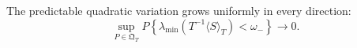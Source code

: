 The predictable quadratic variation grows uniformly in every direction:
\[
 \sup_{P\in\mathfrak Q_T}
 P\!\left\{\lambda_{\min}\!\left(T^{-1}\langle S\rangle_T\right)<\omega_-\right\}
 \longrightarrow0.
\]